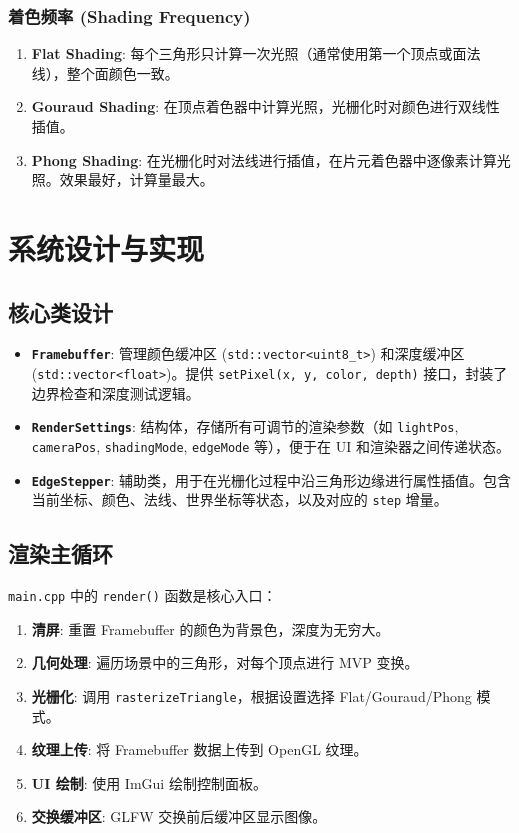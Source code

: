 \documentclass[a4paper]{article}
\begin{document}
\subsubsection{着色频率 (Shading Frequency)}
\begin{enumerate}
    \item \textbf{Flat Shading}: 每个三角形只计算一次光照（通常使用第一个顶点或面法线），整个面颜色一致。
    \item \textbf{Gouraud Shading}: 在顶点着色器中计算光照，光栅化时对颜色进行双线性插值。
    \item \textbf{Phong Shading}: 在光栅化时对法线进行插值，在片元着色器中逐像素计算光照。效果最好，计算量最大。
\end{enumerate}

\section{系统设计与实现}

\subsection{核心类设计}
\begin{itemize}
    \item \textbf{\texttt{Framebuffer}}: 管理颜色缓冲区 (\texttt{std::vector<uint8\_t>}) 和深度缓冲区 (\texttt{std::vector<float>})。提供 \texttt{setPixel(x, y, color, depth)} 接口，封装了边界检查和深度测试逻辑。
    \item \textbf{\texttt{RenderSettings}}: 结构体，存储所有可调节的渲染参数（如 \texttt{lightPos}, \texttt{cameraPos}, \texttt{shadingMode}, \texttt{edgeMode} 等），便于在 UI 和渲染器之间传递状态。
    \item \textbf{\texttt{EdgeStepper}}: 辅助类，用于在光栅化过程中沿三角形边缘进行属性插值。包含当前坐标、颜色、法线、世界坐标等状态，以及对应的 \texttt{step} 增量。
\end{itemize}

\subsection{渲染主循环}
\texttt{main.cpp} 中的 \texttt{render()} 函数是核心入口：
\begin{enumerate}
    \item \textbf{清屏}: 重置 Framebuffer 的颜色为背景色，深度为无穷大。
    \item \textbf{几何处理}: 遍历场景中的三角形，对每个顶点进行 MVP 变换。
    \item \textbf{光栅化}: 调用 \texttt{rasterizeTriangle}，根据设置选择 Flat/Gouraud/Phong 模式。
    \item \textbf{纹理上传}: 将 Framebuffer 数据上传到 OpenGL 纹理。
    \item \textbf{UI 绘制}: 使用 ImGui 绘制控制面板。
    \item \textbf{交换缓冲区}: GLFW 交换前后缓冲区显示图像。
\end{enumerate}
\end{document}
